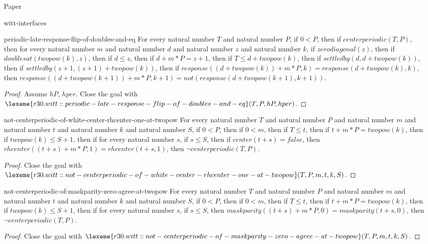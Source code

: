 \begin{lexlean}{Paper}
\begin{section}{witt-interfaces}
  \begin{theorem}{periodic-late-response-flip-of-doubles-and-eq}
  For every natural number \(T\) and natural number \(P\), if \(0 < P\), then if \(centerperiodic(T, P)\), then for every natural number \(m\) and natural number \(d\) and natural number \(z\) and natural number \(k\), if \(zerodiagonal(z)\), then if \(doublesat(twopow(k), z)\), then if \(d ≤ z\), then if \(d + m * P = z + 1\), then if \(T ≤ d + twopow(k)\), then if \(settledby(d, d + twopow(k))\), then if \(settledby(z + 1, (z + 1) + twopow(k))\), then if \(response((d + twopow(k)) + m * P, k) = response(d + twopow(k), k)\), then \(response((d + twopow(k + 1)) + m * P, k + 1) = not(response(d + twopow(k + 1), k + 1))\).
  \begin{proof}
  Assume \(hP\), \(hper\).
  Close the goal with \(\lexeme{r30.witt::periodic-late-response-flip-of-doubles-and-eq}(T, P, hP, hper)\).
  \end{proof}
  \end{theorem}

  \begin{theorem}{not-centerperiodic-of-white-center-rhcenter-one-at-twopow}
  For every natural number \(T\) and natural number \(P\) and natural number \(m\) and natural number \(t\) and natural number \(k\) and natural number \(S\), if \(0 < P\), then if \(0 < m\), then if \(T ≤ t\), then if \(t + m * P = twopow(k)\), then if \(twopow(k) ≤ S + 1\), then if for every natural number \(s\), if \(s ≤ S\), then if \(center(t + s) = false\), then \(rhcenter((t + s) + m * P, 1) = rhcenter(t + s, 1)\), then \(¬ centerperiodic(T, P)\).
  \begin{proof}
  Close the goal with \(\lexeme{r30.witt::not-centerperiodic-of-white-center-rhcenter-one-at-twopow}(T, P, m, t, k, S)\).
  \end{proof}
  \end{theorem}

  \begin{theorem}{not-centerperiodic-of-maskparity-zero-agree-at-twopow}
  For every natural number \(T\) and natural number \(P\) and natural number \(m\) and natural number \(t\) and natural number \(k\) and natural number \(S\), if \(0 < P\), then if \(0 < m\), then if \(T ≤ t\), then if \(t + m * P = twopow(k)\), then if \(twopow(k) ≤ S + 1\), then if for every natural number \(s\), if \(s ≤ S\), then \(maskparity((t + s) + m * P, 0) = maskparity(t + s, 0)\), then \(¬ centerperiodic(T, P)\).
  \begin{proof}
  Close the goal with \(\lexeme{r30.witt::not-centerperiodic-of-maskparity-zero-agree-at-twopow}(T, P, m, t, k, S)\).
  \end{proof}
  \end{theorem}


\end{section}
\end{lexlean}
